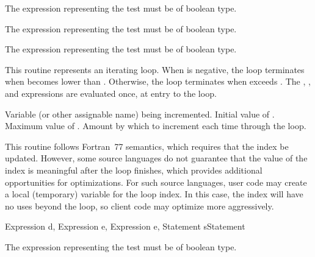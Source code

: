 
\begin{functionality}
The expression representing the test must be of boolean type.
\end{functionality}

\begin{functionality}
The expression representing the test must be of boolean type.
\end{functionality}

\begin{functionality}
The expression representing the test must be of boolean type.
\end{functionality}


\begin{functionality}
This routine represents an iterating loop.  When  is
negative, the loop terminates when  becomes lower than
.  Otherwise, the loop terminates when  exceeds
.  The , , and 
expressions are evaluated once, at entry to the loop.  
\begin{Parameters}
 Variable (or other assignable name) being incremented.
 Initial value of .
 Maximum value of .
 Amount by which to increment  each time
through the loop.
\end{Parameters}

This routine follows Fortran~77 semantics, which requires that the
index be updated.  However, some source languages do not guarantee
that the value of the index is meaningful after the loop finishes,
which provides additional opportunities for optimizations.  For such
source languages, user code may create a local (\ie temporary)
variable for the loop index.  In this case, the index will have no
uses beyond the loop, so client code may optimize more aggressively.

\end{functionality}
	{Expression d, Expression e, Expression e, Statement s}{Statement}
\begin{functionality}
The expression representing the test must be of boolean type.
\end{functionality}

